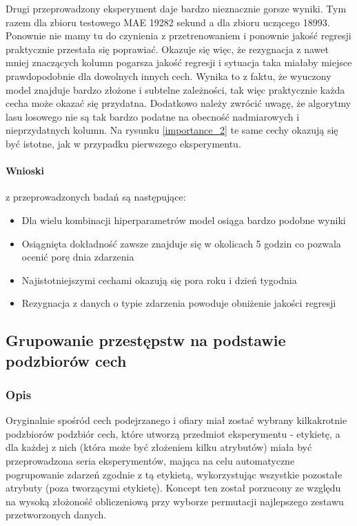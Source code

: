 \documentclass{classrep}
\begin{document}
{{{                Drugi przeprowadzony eksperyment daje bardzo nieznacznie gorsze wyniki.
                Tym razem dla zbioru testowego MAE 19282 sekund a dla zbioru uczącego
                18993. Ponownie nie mamy tu do czynienia z przetrenowaniem i ponownie
                jakość regresji praktycznie przestała się poprawiać. Okazuje się więc,
                że rezygnacja z nawet mniej znaczących kolumn pogarsza jakość regresji
                i sytuacja taka miałaby miejsce prawdopodobnie dla dowolnych innych
                cech. Wynika to z faktu, że wyuczony model znajduje bardzo złożone i
                subtelne zależności, tak więc praktycznie każda cecha może okazać się
                przydatna. Dodatkowo należy zwrócić uwagę, że algorytmy lasu losowego
                nie są tak bardzo podatne na obecność nadmiarowych i nieprzydatnych
                kolumn. Na rysunku \ref{importance_2} te same cechy okazują się być
                istotne, jak w przypadku pierwszego eksperymentu.
                
                \paragraph{Wnioski} z przeprowadzonych badań są następujące:
                \begin{itemize}
                    \item Dla wielu kombinacji hiperparametrów model osiąga bardzo podobne wyniki
                    \item Osiągnięta dokładność zawsze znajduje się w okolicach 5 godzin co pozwala ocenić porę dnia zdarzenia
                    \item Najistotniejszymi cechami okazują się pora roku i dzień tygodnia
                    \item Rezygnacja z danych o typie zdarzenia powoduje obniżenie jakości regresji
                \end{itemize}
            }
        }
        \newpage

        \subsection{Grupowanie przestępstw na podstawie podzbiorów cech}
        \label{project_goal_3} {
            \subsubsection{Opis} {
                Oryginalnie spośród cech podejrzanego i ofiary miał zostać wybrany
                kilkakrotnie podzbiorów podzbiór cech, które utworzą
                przedmiot eksperymentu - etykietę, a dla każdej z
                nich (która może być złożeniem kilku atrybutów) miała być przeprowadzona
                seria eksperymentów, mająca na celu automatyczne pogrupowanie zdarzeń
                zgodnie z tą etykietą, wykorzystując wszystkie pozostałe atrybuty (poza
                tworzącymi etykietę). Koncept ten został porzucony ze względu na wysoką
                złożoność obliczeniową przy wyborze permutacji najlepszego zestawu
                przetworzonych danych.

}}}
\end{document}
